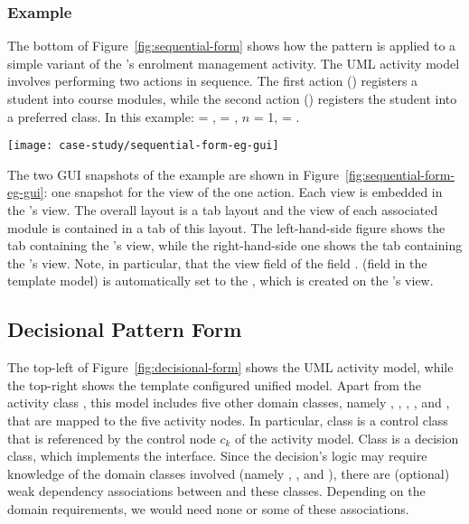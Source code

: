 %
\subsubsection*{Example}
The bottom of Figure~\ref{fig:sequential-form} shows how the pattern is applied to a simple variant of the \courseman's enrolment management activity. The UML activity model involves performing two actions in sequence. The first action () registers a student into course modules, while the second action () registers the student into a preferred class. 
%
In this example:  = ,  = , $ n $ = 1,  = .

\begin{figure*}[ht]
	\begin{center}
		\texttt{[image: case-study/sequential-form-eg-gui]}
	\end{center}
	\caption{The sequential pattern form view of enrolment management activity.} %
	\label{fig:sequential-form-eg-gui}
\end{figure*}

The two GUI snapshots of the example are shown in Figure~\ref{fig:sequential-form-eg-gui}: one snapshot for the view of the one action. Each view is embedded in the 's view. The overall layout is a tab layout and the view of each associated module is contained in a tab of this layout. The left-hand-side figure shows the tab containing the 's view, while the right-hand-side one shows the tab containing the 's view. Note, in particular, that the view field of the field . (field  in the template model) is automatically set to the , which is created on the 's view.

\subsection{Decisional Pattern Form} \label{sect:decisional-pattern}

The top-left of Figure~\ref{fig:decisional-form} shows the UML activity model, while the top-right shows the template configured unified model. Apart from the activity class , this model includes five other domain classes, namely , , , , and , that are mapped to the five activity nodes. In particular, class  is a control class that is referenced by the control node $c_k$ of the activity model. 
Class  is a decision class, which implements the  interface.
%
Since the decision's logic may require knowledge of the domain classes involved (namely , , and ), there are (optional) weak dependency associations between  and these classes. Depending on the domain requirements, we would need none or some of these associations.

